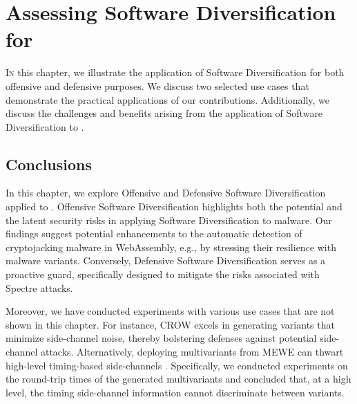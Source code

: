 \chapter{Assessing Software Diversification for \Wasm}
\label{exploit}




\vspace{12mm}

\lettrine[lines=3]{I}{n} this chapter, we illustrate the application of Software Diversification for both offensive and defensive purposes.
We discuss two selected use cases that demonstrate the practical applications of our contributions.
Additionally, we discuss the challenges and benefits arising from the application of Software Diversification to \Wasm.









% 

\section{Conclusions}
In this chapter, we explore Offensive and Defensive Software Diversification applied to \Wasm.
Offensive Software Diversification highlights both the potential and the latent security risks in applying Software Diversification to \Wasm malware. 
Our findings suggest potential enhancements to the automatic detection of cryptojacking malware in WebAssembly, e.g., by stressing their resilience with \Wasm malware variants. 
Conversely, Defensive Software Diversification serves as a proactive guard, specifically designed to mitigate the risks associated with Spectre attacks. 

Moreover, we have conducted experiments with various use cases that are not shown in this chapter.
For instance, CROW \cite{CROW} excels in generating \Wasm variants that minimize side-channel noise, thereby bolstering defenses against potential side-channel attacks. 
Alternatively, deploying multivariants from MEWE \cite{MEWE} can thwart high-level timing-based side-channels \cite{morgan2015web}. 
Specifically, we conducted experiments on the round-trip times of the generated multivariants and concluded that, at a high level, the timing side-channel information cannot discriminate between variants. 
